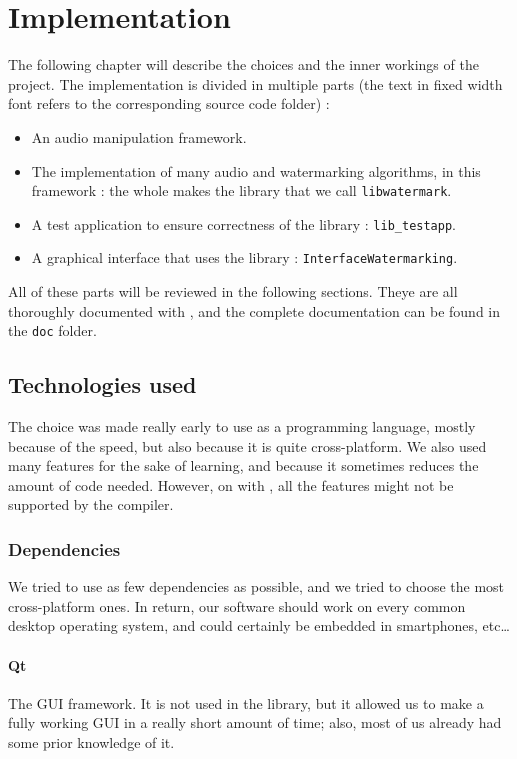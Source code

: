 \chapter{Implementation}
The following chapter will describe the choices and the inner workings of the project.
The implementation is divided in multiple parts (the text in fixed width font refers to the corresponding source code folder) : 

\begin{itemize}
\item An audio manipulation framework.
\item The implementation of many audio and watermarking algorithms, in this framework : the whole makes the library that we call \texttt{libwatermark}.
\item A test application to ensure correctness of the library : \texttt{lib\_testapp}.
\item A graphical interface that uses the library : \texttt{InterfaceWatermarking}.
\end{itemize}

All of these parts will be reviewed in the following sections. Theye are all thoroughly documented with , and the complete documentation can be found in the \texttt{doc} folder.

\section{Technologies used}
The choice was made really early to use  as a programming language, mostly because of the speed, but also because it is quite cross-platform. We also used many  features for the sake of learning, and because it sometimes reduces the amount of code needed. However, on  with , all the features might not be supported by the compiler.

\subsection{Dependencies}
We tried to use as few dependencies as possible, and we tried to choose the most cross-platform ones. In return, our software should work on every common desktop operating system, and could certainly be embedded in smartphones, etc\dots
\subsubsection{Qt}
The GUI framework. It is not used in the library, but it allowed us to make a fully working GUI in a really short amount of time; also, most of us already had some prior knowledge of it.
